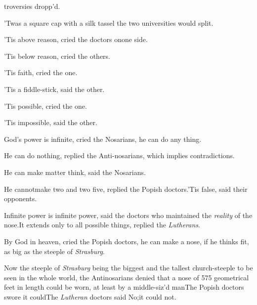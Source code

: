 \documentclass[twoside]{article}
\begin{document}
\vskip -2pt

troversies dropp’d.

\vskip -2pt

’Twas a square cap with a silk tassel\break
{}
the two universities would split.

\vskip -2pt

’Tis above reason, cried the doctors on\break one side.

\vskip -2pt

’Tis below reason, cried the others.

\vskip -2pt

’Tis faith, cried the one.

’Tis a fiddle-stick, said the other.

’Tis possible, cried the one.

’Tis impossible, said the other.

God’s power is infinite, cried the No\-sarians, he can do
any thing.

He can do nothing, replied the Anti-nosarians, which implies
contradictions.

He can make matter think, said the Nosarians.


\break
{}

He cannot\sic make two and two five, replied the Popish
doctors.\tsh ’Tis false, said their opponents.\tsk

Infinite power is infinite power, said the doctors who
maintained the \textit{reality}
of the nose.\tsh It extends only to
all possible things, replied the \textit{Lutherans}.

By God in heaven, cried the Popish doctors, he can make a nose,
if he thinks fit, as big as the steeple of \textit{Strasburg}.

Now the steeple of \textit{Strasburg} being the biggest and the
tallest church-steeple to be seen in the whole world, the
Antino\-sarians denied that a nose of 575 geome\-trical feet in length
could be worn, at least by a middle-siz’d
man\tsk The Popish doctors swore it could\tsk The
\textit{Lutheran} doctors said No;\tsk it could not.
\end{document}
